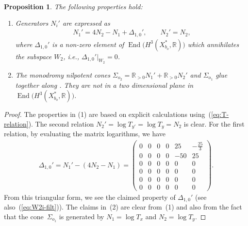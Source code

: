 \documentclass[10pt,a4paper]{amsart}
\numberwithin{equation}{section}
\newtheorem{Proposition}[Theorem]{Proposition}
\begin{document}
\begin{Proposition}
\label{prop:Sigma0+Sigma2}The following properties hold:
\begin{enumerate}\itemsep=0pt
\item[{\rm (1)}] Generators $N_{i}'$ are expressed as
\begin{gather*}
N_{1}'=4N_{2}-N_{1}+\Delta_{1,0}',\qquad N_{2}'=N_{2},
\end{gather*}
where $\Delta_{1,0}'$ is a non-zero element of $\operatorname{End}\big(H^{3}(X_{b_{o}}^{*},\mathbb{R})\big)$ which annihilates the subspace $W_{2}$, i.e., $\Delta_{1,0}'\vert_{W_{2}}=0$.

\item[{\rm (2)}] The monodromy nilpotent cones $\Sigma_{o_{2}}=\mathbb{R}_{>0}N_{1}'+\mathbb{R}_{>0}N_{2}'$ and $\Sigma_{o_{1}}$ glue together along . They are not in a two dimensional plane in $\operatorname{End}\big(H^{3}(X_{b_{o}}^{*},\mathbb{R})\big)$.
\end{enumerate}\end{Proposition}
\begin{proof} The properties in (1) are based on explicit calculations using~(\ref{eq:T-relation}). The second relation $N_{2}'=\log T_{y'}=\log T_{y}=N_{2}$ is clear. For the first relation, by evaluating the matrix logarithms, we have
\begin{gather*}
\Delta_{1,0}'=N_{1}'-(4N_{2}-N_{1})=\left(\begin{smallmatrix}0 & 0 & 0 & 0 & 25 & -\frac{25}{3}\\
0 & 0 & 0 & 0 & -50 & 25\\
0 & 0 & 0 & 0 & 0 & 0\\
0 & 0 & 0 & 0 & 0 & 0\\
0 & 0 & 0 & 0 & 0 & 0\\
0 & 0 & 0 & 0 & 0 & 0
\end{smallmatrix}\right).
\end{gather*}
From this triangular form, we see the claimed property of $\Delta_{1,0}'$ (see also~(\ref{eq:W2i-filt})). The claims in~(2) are clear from~(1) and also from the fact that the cone~$\Sigma_{o_{1}}$ is generated by $N_{1}=\log T_{x}$ and $N_{2}=\log T_{y}$.
\end{proof}
\end{document}
